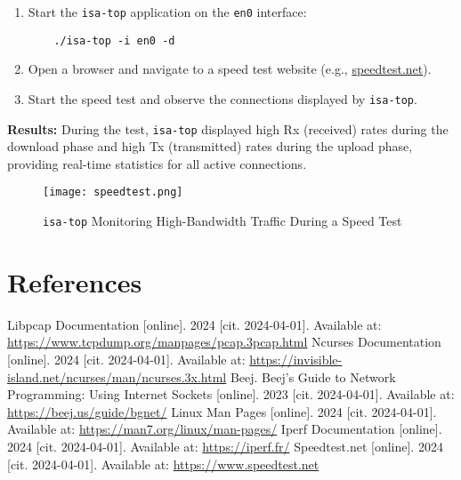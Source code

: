 \documentclass[12pt]{extarticle}
\begin{document}
\begin{enumerate}
    \item Start the \texttt{isa-top} application on the \texttt{en0} interface:
    \begin{verbatim}
    ./isa-top -i en0 -d
    \end{verbatim}
    \item Open a browser and navigate to a speed test website (e.g., \href{https://www.speedtest.net}{speedtest.net}).
    \item Start the speed test and observe the connections displayed by \texttt{isa-top}.
\end{enumerate}

\textbf{Results:} During the test, \texttt{isa-top} displayed high Rx (received) rates during the download phase and high Tx (transmitted) rates during the upload phase, providing real-time statistics for all active connections.

\begin{figure}[H]
    \centering
    \texttt{[image: speedtest.png]}
    \caption{\texttt{isa-top} Monitoring High-Bandwidth Traffic During a Speed Test}
\end{figure}

\section{References}
\begin{thebibliography}{9}
     Libpcap Documentation [online]. 2024 [cit. 2024-04-01]. Available at: \url{https://www.tcpdump.org/manpages/pcap.3pcap.html}
     Ncurses Documentation [online]. 2024 [cit. 2024-04-01]. Available at: \url{https://invisible-island.net/ncurses/man/ncurses.3x.html}
     Beej. Beej's Guide to Network Programming: Using Internet Sockets [online]. 2023 [cit. 2024-04-01]. Available at: \url{https://beej.us/guide/bgnet/}
     Linux Man Pages [online]. 2024 [cit. 2024-04-01]. Available at: \url{https://man7.org/linux/man-pages/}
     Iperf Documentation [online]. 2024 [cit. 2024-04-01]. Available at: \url{https://iperf.fr/}
     Speedtest.net [online]. 2024 [cit. 2024-04-01]. Available at: \url{https://www.speedtest.net}
\end{thebibliography}
\end{document}

